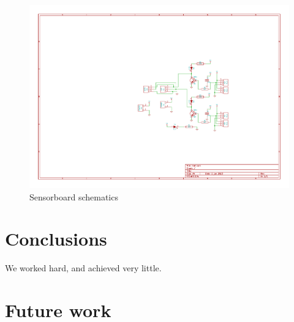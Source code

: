 \documentclass[12pt]{article}
\begin{document}
\begin{figure}[htb]
\begin{center}
\includegraphics[width=20cm,angle=-90]{pic/sensorboard}
\caption{Sensorboard schematics}
\end{center}
\label{figsensorboardscm}
\end{figure}


\section{Conclusions}\label{conclusions}
We worked hard, and achieved very little.

\section{Future work}



\end{document}
